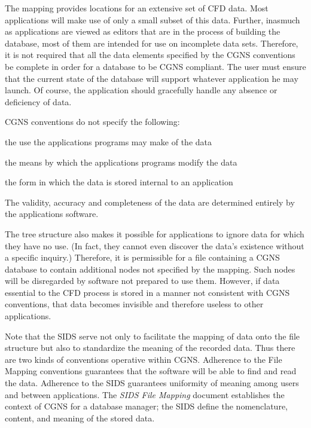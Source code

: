 The mapping provides locations for an extensive set of CFD
data.
Most applications will make use of only a small subset of this data.
Further, inasmuch as applications are viewed as editors that are in the
process of building the database, most of them are intended for use on
incomplete data sets.
Therefore, it is not required that all the data elements specified by
the CGNS conventions be complete in order for a database to be CGNS
compliant.
The user must ensure that the current state of the database will support
whatever application he may launch.
Of course, the application should gracefully handle any absence or
deficiency of data.

CGNS conventions do not specify the following:

\begin{itemize*}
\item the use the applications programs may make of the data
\item the means by which the applications programs modify the data
\item the form in which the data is stored internal to an application
\end{itemize*}

\noindent
The validity, accuracy and completeness of the data are determined
entirely by the applications software.

The tree structure also makes it possible for applications
to ignore data for which they have no use.
(In fact, they cannot even discover the data's existence without a
specific inquiry.)
Therefore, it is permissible for a file containing a CGNS
database to contain additional nodes not specified by the mapping.
Such nodes will be disregarded by software not prepared to use them.
However, if data essential to the CFD process is stored in a manner
not consistent with CGNS conventions, that data becomes invisible and
therefore useless to other applications.

Note that the SIDS serve not only to facilitate the mapping of data onto
the file structure but also to standardize the meaning of
the recorded data.
Thus there are two kinds of conventions operative within CGNS.
Adherence to the File Mapping conventions guarantees that the software
will be able to find and read the data.
Adherence to the SIDS guarantees uniformity of meaning among users and
between applications.
The \textit{SIDS File Mapping} document establishes the
context of CGNS for a database manager; the SIDS define the
nomenclature, content, and meaning of the stored data.

